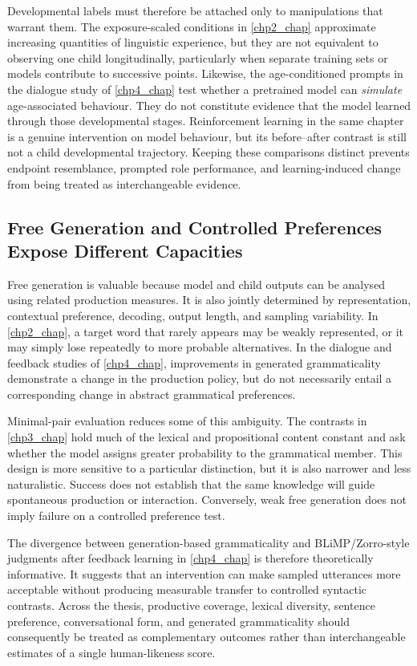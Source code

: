 Developmental labels must therefore be attached only to manipulations that warrant them. The exposure-scaled conditions in \cref{chp2_chap} approximate increasing quantities of linguistic experience, but they are not equivalent to observing one child longitudinally, particularly when separate training sets or models contribute to successive points. Likewise, the age-conditioned prompts in the dialogue study of \cref{chp4_chap} test whether a pretrained model can \emph{simulate} age-associated behaviour. They do not constitute evidence that the model learned through those developmental stages. Reinforcement learning in the same chapter is a genuine intervention on model behaviour, but its before--after contrast is still not a child developmental trajectory. Keeping these comparisons distinct prevents endpoint resemblance, prompted role performance, and learning-induced change from being treated as interchangeable evidence.

\subsection{Free Generation and Controlled Preferences Expose Different Capacities}

Free generation is valuable because model and child outputs can be analysed using related production measures. It is also jointly determined by representation, contextual preference, decoding, output length, and sampling variability. In \cref{chp2_chap}, a target word that rarely appears may be weakly represented, or it may simply lose repeatedly to more probable alternatives. In the dialogue and feedback studies of \cref{chp4_chap}, improvements in generated grammaticality demonstrate a change in the production policy, but do not necessarily entail a corresponding change in abstract grammatical preferences.

Minimal-pair evaluation reduces some of this ambiguity. The contrasts in \cref{chp3_chap} hold much of the lexical and propositional content constant and ask whether the model assigns greater probability to the grammatical member. This design is more sensitive to a particular distinction, but it is also narrower and less naturalistic. Success does not establish that the same knowledge will guide spontaneous production or interaction. Conversely, weak free generation does not imply failure on a controlled preference test.

The divergence between generation-based grammaticality and BLiMP/Zorro-style judgments after feedback learning in \cref{chp4_chap} is therefore theoretically informative. It suggests that an intervention can make sampled utterances more acceptable without producing measurable transfer to controlled syntactic contrasts. Across the thesis, productive coverage, lexical diversity, sentence preference, conversational form, and generated grammaticality should consequently be treated as complementary outcomes rather than interchangeable estimates of a single human-likeness score.

